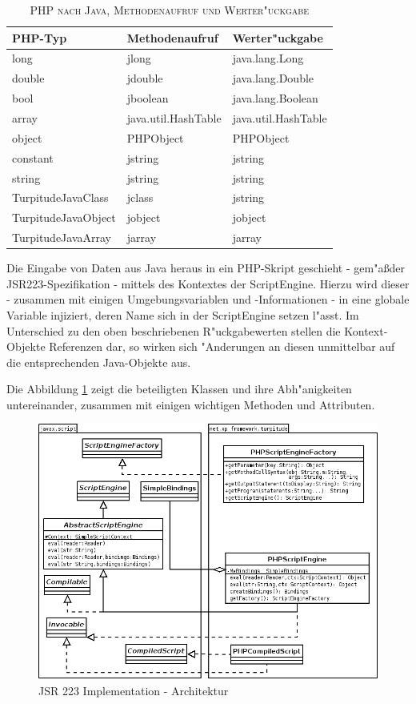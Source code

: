 \begin{table}
\label{tab:phptojava}
\caption{\textsc{PHP nach Java, Methodenaufruf und Werter"uckgabe}}
\begin{tabular}[tbh]{|l|l|l|}
\hline
PHP-Typ & Methodenaufruf & Werter"uckgabe\\
\hline\hline
long & jlong & java.lang.Long \\
double & jdouble & java.lang.Double \\
bool & jboolean  & java.lang.Boolean \\
array & java.util.HashTable & java.util.HashTable \\
object & PHPObject & PHPObject\\
constant & jstring & jstring\\
string & jstring & jstring \\
TurpitudeJavaClass & jclass & jstring\\
TurpitudeJavaObject & jobject & jobject\\
TurpitudeJavaArray & jarray & jarray\\
\hline
\end{tabular}
\end{table}


Die Eingabe von Daten aus Java heraus in ein PHP-Skript geschieht - gem"a\ss der JSR223-Spezifikation - mittels des Kontextes der
ScriptEngine. Hierzu wird dieser - zusammen mit einigen Umgebungsvariablen und -Informationen - in eine globale Variable injiziert,
deren Name sich in der ScriptEngine setzen l"asst. Im Unterschied zu den oben beschriebenen R"uckgabewerten stellen die Kontext-Objekte
Referenzen dar, so wirken sich "Anderungen an diesen unmittelbar auf die entsprechenden Java-Objekte aus.

Die Abbildung \ref{fig:jsr223impl} zeigt die beteiligten Klassen und ihre Abh"anigkeiten untereinander,
zusammen mit einigen wichtigen Methoden und Attributen. 

\begin{figure}[h]
\includegraphics[width=\textwidth]{chap1/img/turpitude.png}
\caption{JSR 223 Implementation - Architektur}
\label{fig:jsr223impl}
\end{figure}

